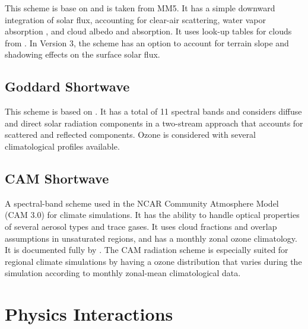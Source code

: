 This scheme is base on \citet{dudhia89} and is taken from MM5. It has a simple 
downward integration of solar flux, accounting for clear-air scattering, 
water vapor absorption \citep{lacis74}, and cloud albedo and absorption. 
It uses look-up tables for clouds from \citet{stephens78}. In Version 3,
the scheme has an option to account for terrain slope and shadowing effects
on the surface solar flux.

\subsection {Goddard Shortwave}

This scheme is based on \citet{chou94}. It has a total of 11 spectral 
bands and considers diffuse and direct solar radiation components in a two-stream 
approach that accounts for scattered and reflected components. Ozone is considered 
with several climatological profiles available.

\subsection {CAM Shortwave}

A spectral-band scheme used in the NCAR Community Atmosphere
Model (CAM 3.0) for climate simulations. It has the ability to handle optical properties of
several aerosol types and trace gases. It uses cloud fractions and overlap assumptions
in unsaturated regions, and has a monthly zonal ozone climatology. It is documented fully by 
\citet{collins04}.
The CAM radiation scheme is especially suited for regional climate simulations by having a 
ozone distribution that varies during the simulation according
to monthly zonal-mean climatological data.

\section {Physics Interactions}


